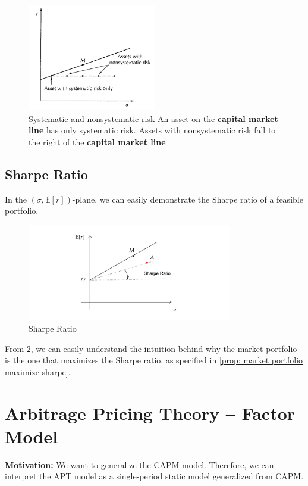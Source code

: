 \documentclass[13pt]{article}
\theoremstyle{definition}
\theoremstyle{remark}
\newcommand{\EE}{\mathbb{E}}
\begin{document}
\begin{figure}[!htp]
    \centering
    \includegraphics[width=0.5\textwidth]{systematic risk.png}
    \caption{Systematic and nonsystematic risk An asset on the \textbf{capital market line} has only systematic risk. Assets with nonsystematic risk fall to the right of the \textbf{capital market line}}
    \label{fig:systematic risk}
\end{figure}

\subsection{Sharpe Ratio}
In the $(\sigma, \EE[r])$-plane, we can easily demonstrate the Sharpe ratio of a feasible portfolio.
\begin{figure}[!htp]
\centering
\includegraphics[width=0.8\textwidth]{sharpe ratio.png}
\caption{Sharpe Ratio}
\label{fig:sharpe ratio}
\end{figure}
From \cref{fig:sharpe ratio}, we can easily understand the intuition behind why the market portfolio is the one that maximizes the Sharpe ratio, as specified in \cref{prop: market portfolio maximize sharpe}.






\newpage
\section{Arbitrage Pricing Theory -- Factor Model}
{\color{C6}\textbf{Motivation:} We want to generalize the CAPM model. Therefore, we can interpret the APT model as a single-period static model generalized from CAPM.}
\end{document}
